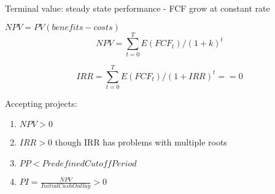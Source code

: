 \documentclass[8pt]{report}
\begin{document}
\begin{multicols}{2}
[]
Terminal value: steady state performance - FCF grow at constant rate

$NPV = PV(benefits - costs)$
$$
NPV = \sum_{t=0}^{T} E(FCF_t) / (1+k)^t
$$

$$
IRR = \sum_{t=0}^{T} E(FCF_t) / (1+IRR)^t == 0
$$

Accepting projects:
\begin{enumerate}
\item $NPV > 0$
\item $IRR > 0$ though IRR has problems with multiple roots
\item $PP < PredefinedCutoffPeriod$
\item $PI = \frac{NPV}{InitialCashOutlay} > 0$
\end{enumerate}
\end{multicols}
\end{document}
